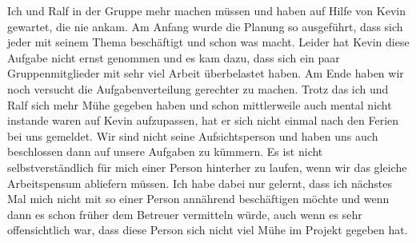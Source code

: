 Ich und Ralf in der Gruppe mehr machen müssen und haben auf Hilfe von Kevin gewartet, die nie ankam. Am Anfang wurde die Planung so ausgeführt, dass sich jeder mit seinem Thema beschäftigt und schon was macht. 
Leider hat Kevin diese Aufgabe nicht ernst genommen und es kam dazu, dass sich ein paar Gruppenmitglieder mit sehr viel Arbeit überbelastet haben. Am Ende haben wir noch versucht die Aufgabenverteilung gerechter zu machen. 
Trotz das ich und Ralf sich mehr Mühe gegeben haben und schon mittlerweile auch mental nicht instande waren auf Kevin aufzupassen, hat er sich nicht einmal nach den Ferien bei uns gemeldet.
Wir sind nicht seine Aufsichtsperson und haben uns auch beschlossen dann auf unsere Aufgaben zu kümmern. Es ist nicht selbstverständlich für mich einer Person hinterher zu laufen,
wenn wir das gleiche Arbeitspensum abliefern müssen. Ich habe dabei nur gelernt, dass ich nächstes Mal mich nicht mit so einer Person annährend beschäftigen möchte und wenn dann es schon früher
dem Betreuer vermitteln würde, auch wenn es sehr offensichtlich war, dass diese Person sich nicht viel Mühe im Projekt gegeben hat.
